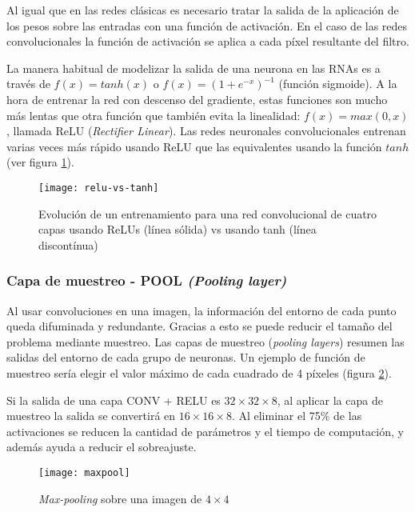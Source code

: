 Al igual que en las redes clásicas es necesario tratar la salida de la
aplicación de los pesos sobre las entradas con una función de activación. En el
caso de las redes convolucionales la función de activación se aplica a cada
píxel resultante del filtro.

La manera habitual de modelizar la salida de una neurona en las RNAs es a
través de $f(x) = tanh(x)$ o $f(x) = (1 + e^{-x})^{-1}$ (función sigmoide). A
la hora de entrenar la red con descenso del gradiente, estas funciones son
mucho más lentas que otra función que también evita la linealidad: $f(x) =
max(0, x)$, llamada ReLU (\textit{Rectifier Linear}). Las redes neuronales
convolucionales entrenan varias veces más rápido usando ReLU  que las
equivalentes usando la función $tanh$ (ver figura \ref{relu-vs-tanh}).

\begin{figure}
    \centering
    \caption{Evolución de un entrenamiento para una red convolucional de cuatro capas usando ReLUs (línea sólida) vs usando tanh (línea discontínua) \parencite{krizhevsky2012imagenet}}
  \label{relu-vs-tanh}
  \texttt{[image: relu-vs-tanh]}
\end{figure}

\subsubsection{Capa de muestreo - POOL \textit{(Pooling layer)}}

Al usar convoluciones en una imagen, la información del entorno de cada punto
queda difuminada y redundante. Gracias a esto se puede reducir el tamaño del
problema mediante muestreo. Las capas de muestreo (\textit{pooling layers})
resumen las salidas del entorno de cada grupo de neuronas. Un ejemplo de
función de muestreo sería elegir el valor máximo de cada cuadrado de 4 píxeles
(figura \ref{maxpool}).

Si la salida de una capa CONV + RELU es $32 \times 32 \times 8$, al aplicar la capa de muestreo la salida se convertirá en $16 \times 16 \times 8$. Al eliminar el 75\% de las activaciones se reducen la cantidad de parámetros y el tiempo de computación, y además ayuda a reducir el sobreajuste.

\begin{figure}
    \centering
    \caption{\textit{Max-pooling} sobre una imagen de $4\times4$}
  \label{maxpool}
  \texttt{[image: maxpool]}
\end{figure}

